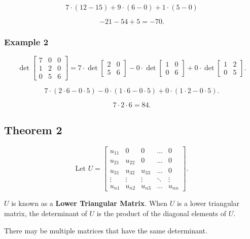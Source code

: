 \documentclass[12pt]{article}
\begin{document}
\[
  7 \cdot (12 - 15) + 9 \cdot (6 - 0) + 1 \cdot (5 - 0)
\]

\[
-21 -54 +5 = -70
.\]

\subsubsection*{Example 2}

\[
  \det{
    \begin{bmatrix}
      7 & 0 & 0 \\
      1 & 2 & 0 \\
      0 & 5 & 6
    \end{bmatrix}
  }
  =
  7 \cdot \det{
    \begin{bmatrix}
      2 & 0 \\
      5 & 6
    \end{bmatrix}
  }
  -
  0 \cdot \det{
    \begin{bmatrix}
      1 & 0 \\
      0 & 6
    \end{bmatrix}
  }
  +
  0 \cdot \det{
    \begin{bmatrix}
      1 & 2 \\
      0 & 5
    \end{bmatrix}
  }
.\]

\[
  7 \cdot (2 \cdot 6 - 0 \cdot 5) - 0 \cdot (1 \cdot 6 - 0 \cdot 5) + 0 \cdot (1 \cdot 2 - 0 \cdot 5)
.\]

\[
  7 \cdot 2 \cdot 6 = 84
.\]

\subsection*{Theorem 2}

\[
  \text{Let } U = \begin{bmatrix} 
    u_{11} & 0 & 0 & \dots & 0 \\
    u_{21} & u_{22} & 0 & \dots & 0 \\
    u_{31} & u_{32} & u_{33} & \dots & 0 \\
    \vdots & \vdots & \vdots & \ddots & \vdots \\
    u_{n1} & u_{n2} & u_{n3} & \dots & u_{nn}
  \end{bmatrix}
.\]

$U$ is known as a \textbf{Lower Triangular Matrix}. When $U$ is a lower
triangular matrix, the determinant of $U$ is the product of the diagonal
elements of $U$.

There may be multiple matrices that have the same determinant.
\end{document}
